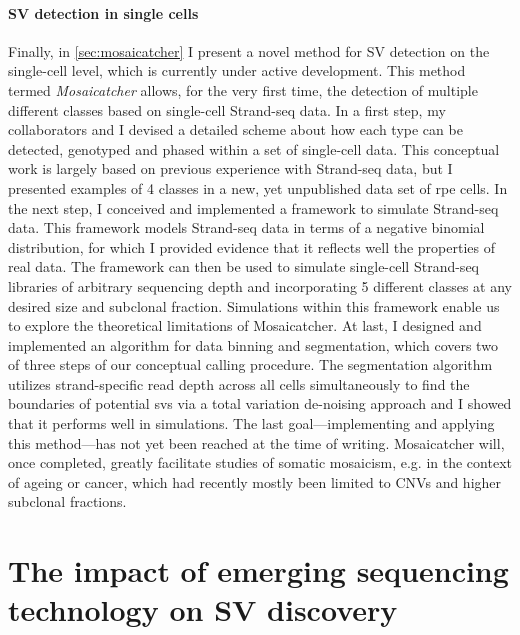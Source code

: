 \paragraph{SV detection in single cells}
Finally, in \cref{sec:mosaicatcher} I present a novel method for SV detection on
the single-cell level, which is currently under active development. This method
termed \emph{Mosaicatcher} allows, for the very first time, the detection of
multiple different \sv classes based on single-cell Strand-seq data. In a first
step, my collaborators and I devised a detailed scheme about how each \sv type
can be detected, genotyped and phased within a set of single-cell data. This
conceptual work is largely based on previous experience with Strand-seq data,
but I presented examples of 4 \sv classes in a new, yet
unpublished data set of \acl{rpe} cells. In the next step, I conceived and
implemented a framework to simulate Strand-seq data. This framework models
Strand-seq data in terms of a negative binomial distribution, for which I
provided evidence that it reflects well the properties of real data. The
framework can then be used to simulate single-cell Strand-seq libraries of
arbitrary sequencing depth and incorporating 5
different \sv classes at any desired size and subclonal fraction. Simulations
within this framework enable us to explore the theoretical limitations of
Mosaicatcher. At last, I designed and implemented an algorithm for data binning
and segmentation, which covers two of three steps of our conceptual \sv calling
procedure. The segmentation algorithm utilizes strand-specific read depth across
all cells simultaneously to find the boundaries of potential \acp{sv} via a
total variation de-noising approach and I showed that it performs well in
simulations. The last goal---implementing and applying this method---has not yet
been reached at the time of writing. Mosaicatcher will, once completed, greatly
facilitate studies of somatic mosaicism, e.g. in the context of ageing or cancer,
which had recently mostly been limited to CNVs and higher subclonal fractions.






\section{The impact of emerging sequencing technology on SV discovery}
\label{sec:impact}
